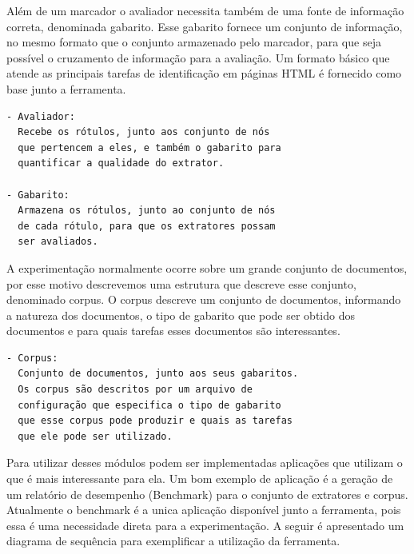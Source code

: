 \documentclass[12pt, a4paper]{article}
\begin{document}
Além de um marcador o avaliador necessita também de uma fonte de
informação correta, denominada gabarito. Esse gabarito fornece um
conjunto de informação, no mesmo formato que o conjunto armazenado pelo
marcador, para que seja possível o cruzamento de informação para a
avaliação. Um formato básico que atende as principais tarefas de
identificação em páginas HTML é fornecido como base junto a ferramenta.

\begin{verbatim}
- Avaliador:
  Recebe os rótulos, junto aos conjunto de nós
  que pertencem a eles, e também o gabarito para
  quantificar a qualidade do extrator.

- Gabarito: 
  Armazena os rótulos, junto ao conjunto de nós
  de cada rótulo, para que os extratores possam
  ser avaliados.
\end{verbatim}

A experimentação normalmente ocorre sobre um grande conjunto de
documentos, por esse motivo descrevemos uma estrutura que descreve esse
conjunto, denominado corpus. O corpus descreve um conjunto de
documentos, informando a natureza dos documentos, o tipo de gabarito que
pode ser obtido dos documentos e para quais tarefas esses documentos são
interessantes.

\begin{verbatim}
- Corpus: 
  Conjunto de documentos, junto aos seus gabaritos.
  Os corpus são descritos por um arquivo de
  configuração que especifica o tipo de gabarito
  que esse corpus pode produzir e quais as tarefas
  que ele pode ser utilizado.
\end{verbatim}

Para utilizar desses módulos podem ser implementadas aplicações que
utilizam o que é mais interessante para ela. Um bom exemplo de aplicação
é a geração de um relatório de desempenho (Benchmark) para o conjunto de
extratores e corpus. Atualmente o benchmark é a unica aplicação
disponível junto a ferramenta, pois essa é uma necessidade direta para a
experimentação. A seguir é apresentado um diagrama de sequência para
exemplificar a utilização da ferramenta.
\end{document}
